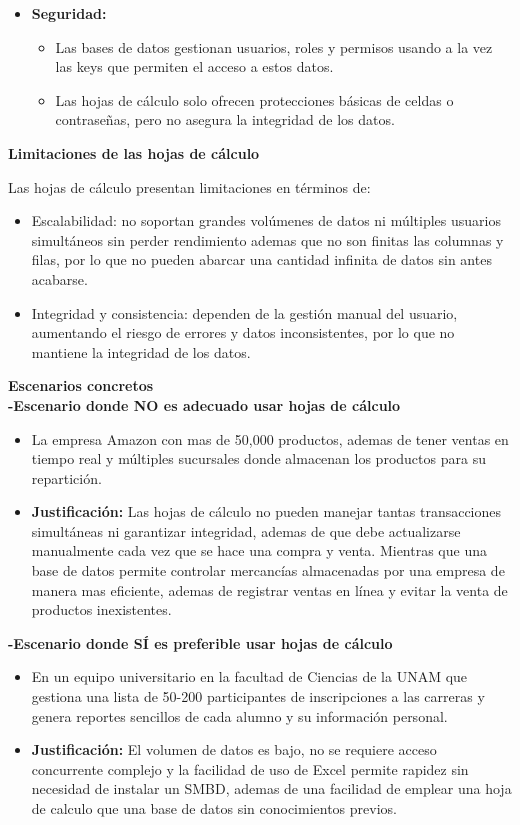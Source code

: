 \documentclass[12pt]{report}
\begin{document}
\begin{enumerate}[label=\textbf{\arabic*.}, leftmargin=*]
\begin{enumerate}[label=\textbf{\alph*.}, leftmargin=*, itemsep=1.0em]
\begin{itemize}
    \item \textbf{Seguridad:}
    \begin{itemize}
        \item Las bases de datos gestionan usuarios, roles y permisos usando a la vez las keys que permiten el acceso a estos datos.
        \item Las hojas de cálculo solo ofrecen protecciones básicas de celdas o contraseñas, pero no asegura la integridad de los datos.
    \end{itemize}
\end{itemize}

\textbf{Limitaciones de las hojas de cálculo}

Las hojas de cálculo presentan limitaciones en términos de:
\begin{itemize}
    \item Escalabilidad: no soportan grandes volúmenes de datos ni múltiples usuarios simultáneos sin perder rendimiento ademas que no son finitas las columnas y filas, por lo que no pueden abarcar una cantidad infinita de datos sin antes acabarse.
    \item Integridad y consistencia: dependen de la gestión manual del usuario, aumentando el riesgo de errores y datos inconsistentes, por lo que no mantiene la integridad de los datos.
\end{itemize}
\newpage
\textbf{Escenarios concretos}\\
\textbf{-Escenario donde NO es adecuado usar hojas de cálculo}
\begin{itemize}
    \item La empresa Amazon con mas de 50,000 productos, ademas de tener ventas en tiempo real y múltiples sucursales donde almacenan los productos para su repartición.
    \item \textbf{Justificación:} Las hojas de cálculo no pueden manejar tantas transacciones simultáneas ni garantizar integridad, ademas de que debe actualizarse manualmente cada vez que se hace una compra y venta. Mientras que una base de datos permite controlar mercancías almacenadas por una empresa de manera mas eficiente, ademas de registrar ventas en línea y evitar la venta de productos inexistentes.
\end{itemize}

\textbf{-Escenario donde SÍ es preferible usar hojas de cálculo}
\begin{itemize}
    \item En un equipo universitario en la facultad de Ciencias de la UNAM que gestiona una lista de 50-200 participantes de inscripciones a las carreras y genera reportes sencillos de cada alumno y su información personal.
    \item \textbf{Justificación:} El volumen de datos es bajo, no se requiere acceso concurrente complejo y la facilidad de uso de Excel permite rapidez sin necesidad de instalar un SMBD, ademas de una facilidad de emplear una hoja de calculo que una base de datos sin conocimientos previos.
\end{itemize}


\end{enumerate}
\end{enumerate}
\end{document}
